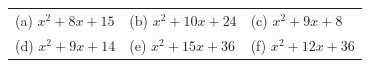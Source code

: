 \begin{enumerate}[noitemsep, label=\textbf{\arabic*}. ]
{        \addtolength{\mytableboxheight}{\mytableboxdepth}
        \begin{center}
      \label{m39394*id277586}
    \noindent
      \tablelasttail{}
      \begin{xtabular*}{\mytablewidth}[t]{|p{10\mystarwidth}|p{10\mystarwidth}|p{10\mystarwidth}|}\hline
        (a) ${x}^{2}+8x+15$\hspace{1ex} &
        (b) ${x}^{2}+10x+24$\hspace{1ex} &
        (c) ${x}^{2}+9x+8$\hspace{1ex}%
     \tabularnewline{}
        (d) ${x}^{2}+9x+14$\hspace{1ex} &
        (e) ${x}^{2}+15x+36$\hspace{1ex} &
        (f) ${x}^{2}+12x+36$\hspace{1ex}%

\end{xtabular*}
\end{center}}
\end{enumerate}
